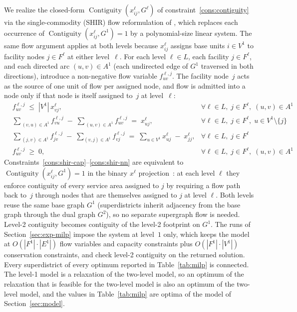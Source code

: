 \documentclass[preprint,12pt,authoryear]{elsarticle}
\theoremstyle{definition}
\DeclareMathOperator{\Contiguity}{Contiguity}  %
\begin{document}
We realize the closed-form $\Contiguity(x^{\ell}_{ij}, G^\ell)$ of
constraint~\eqref{cons:contiguity} via the single-commodity (SHIR) flow
reformulation of \citet{shirabe2005model}, which replaces each occurrence of
$\Contiguity(x^{\ell}_{ij}, G^1) = 1$ by a polynomial-size linear system. The
same flow argument applies at both levels because $x^{\ell}_{ij}$ assigns base
units $i \in V^1$ to facility nodes $j \in F^{\ell}$ at either level~$\ell$.
For each level $\ell \in L$, each facility $j \in F^{\ell}$, and each directed
arc $(u, v) \in A^1$ (each undirected edge of $G^1$ traversed in both
directions), introduce a non-negative flow variable $f^{\ell,j}_{uv}$. The
facility node~$j$ acts as the source of one unit of flow per assigned node,
and flow is admitted into a node only if that node is itself assigned to~$j$
at level~$\ell$:
\begin{align}
   & f^{\ell,j}_{uv} \;\leq\; |V^1|\, x^{\ell}_{vj},
   &\forall \ell \in L,\; j \in F^{\ell},\; (u,v) \in A^1
     \label{cons:shir-cap} \\
   & \sum_{\,(v,u)\in A^1} f^{\ell,j}_{vu} \;-\;
     \sum_{\,(u,v)\in A^1} f^{\ell,j}_{uv} \;=\; x^{\ell}_{uj},
   &\forall \ell \in L,\; j \in F^{\ell},\; u \in V^1 \setminus \{j\}
     \label{cons:shir-cons} \\
   & \sum_{\,(j,v)\in A^1} f^{\ell,j}_{jv} \;-\;
     \sum_{(v,j)\in A^1} f^{\ell,j}_{vj} \;=\;
     \sum_{u \in V^1} x^{\ell}_{uj} \;-\; x^{\ell}_{jj},
   &\forall \ell \in L,\; j \in F^{\ell}
     \label{cons:shir-source} \\
   & f^{\ell,j}_{uv} \;\geq\; 0,
   &\forall \ell \in L,\; j \in F^{\ell},\; (u,v) \in A^1
     \label{cons:shir-nn}
\end{align}
Constraints~\eqref{cons:shir-cap}--\eqref{cons:shir-nn} are equivalent to
$\Contiguity(x^{\ell}_{i j}, G^1) = 1$ in the binary $x^{\ell}$
projection~\citep{validi2022imposing}: at each level $\ell$ they enforce
contiguity of every service area assigned to $j$ by requiring a flow path
back to~$j$ through nodes that are themselves assigned to $j$ at level
$\ell$. Both levels reuse the same base graph $G^1$ (superdistricts inherit
adjacency from the base graph through the dual graph $G^2$), so no separate supergraph flow is needed. Level-2 contiguity becomes contiguity of the level-2 footprint on $G^1$. The runs of Section~\ref{sec:exp-milp} impose the system at level~$1$ only, which keeps the model at $O(|F^{1}|\cdot|E^{1}|)$ flow variables and capacity constraints plus $O(|F^{1}|\cdot|V^{1}|)$ conservation constraints, and check level-2 contiguity on the returned solution. Every superdistrict of every optimum reported in Table~\ref{tab:milp} is connected. The level-1 model is a relaxation of the two-level model, so an optimum of the relaxation that is feasible for the two-level model is also an optimum of the two-level model, and the values in Table~\ref{tab:milp} are optima of the model of Section~\ref{sec:model}.
\end{document}

